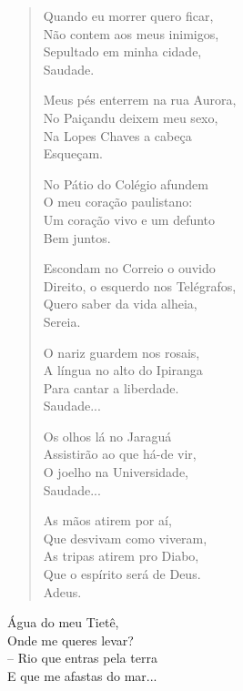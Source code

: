 \pagebreak
{}

\begin{verse}
Quando eu morrer quero ficar,\\
Não contem aos meus inimigos,\\
Sepultado em minha cidade,\\
\quad\quad{}Saudade.

Meus pés enterrem na rua Aurora,\\
No Paiçandu deixem meu sexo,\\
Na Lopes Chaves a cabeça\\
\quad\quad{}Esqueçam.

No Pátio do Colégio afundem\\
O meu coração paulistano:\\
Um coração vivo e um defunto\\
\quad\quad{}Bem juntos.

Escondam no Correio o ouvido\\
Direito, o esquerdo nos Telégrafos,\\
Quero saber da vida alheia,\\
\quad\quad{}Sereia.

O nariz guardem nos rosais,\\
A língua no alto do Ipiranga\\
Para cantar a liberdade.\\
\quad\quad{}Saudade...

Os olhos lá no Jaraguá\\
Assistirão ao que há-de vir,\\
O joelho na Universidade,\\
\quad\quad{}Saudade...

As mãos atirem por aí,\\
Que desvivam como viveram,\\
As tripas atirem pro Diabo,\\
Que o espírito será de Deus.\\
\quad\quad{}Adeus.
\end{verse}



\epigraph{Água do meu Tietê,\\
Onde me queres levar?\\
-- Rio que entras pela terra\\
E que me afastas do mar...}{}

